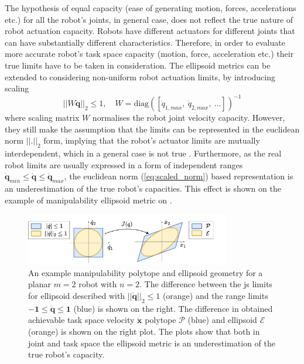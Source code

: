 The hypothesis of equal capacity (ease of generating motion, forces, accelerations etc.) for all the robot's joints, in general case, does not reflect the true nature of robot actuation capacity. Robots have different actuators for different joints that can have substantially different characteristics. Therefore, in order to evaluate more accurate robot's task space capacity (motion, force, acceleration etc.) their true limits have to be taken in consideration. The ellipsoid metrics can be extended to considering non-uniform robot actuation limits, by introducing scaling
\begin{equation}
    ||W\dot{\bm{q}}||_2 \leq 1, \quad W=\text{diag}\left(\left[\dot{q}_{1,max} ,~\dot{q}_{2,max} , ~\ldots\right]\right)^{-1}
    \label{eq:scaled_norm}
\end{equation}    
where scaling matrix $W$ normalises the robot joint velocity capacity. However, they still make the assumption that the limits can be represented in the euclidean norm  $||.||_2$ form, implying that the robot's actuator limits are mutually interdependent, which in a general case is not true \cite{Lee1997manip}. Furthermore, as the real robot limits are usually expressed in a form of independent ranges $ \dot{\bm{q}}_{min} \leq \dot{\bm{q}} \leq \dot{\bm{q}}_{max}$, the euclidean norm (\ref{eq:scaled_norm}) based representation is an underestimation of the true robot's capacities. This effect is shown on the example of manipulability ellipsoid metric on . 

\begin{figure}
    \centering
    \includegraphics[width=0.8\textwidth]{Chapters/imgs/ellip_poly.pdf}
    \caption{An example manipulability polytope and ellipsoid geometry for a planar $m=2$ robot with $n=2$. The difference between the \gls{js} limits for ellipsoid described with $||\dot{\bm{q}}||_2\leq1$ (orange) and the range limits $\bm{-1}\leq\dot{\bm{q}}\leq\bm{1}$ (blue) is shown on the right. The difference in obtained achievable task space velocity $\dot{\bm{x}}$ polytope $\mathcal{P}$ (blue) and ellipsoid $\mathcal{E}$ (orange) is shown on the right plot. The plots show that both in joint and task space the ellipsoid metric is an underestimation of the true robot's capacity.}
    \label{fig:ellip_poly_dif}
\end{figure}

